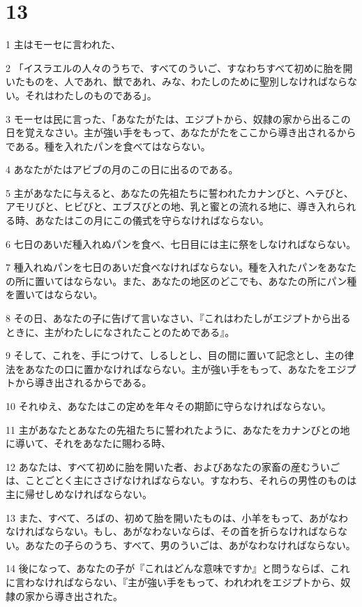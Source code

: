 \chapter{13}

\par 1 主はモーセに言われた、
\par 2 「イスラエルの人々のうちで、すべてのういご、すなわちすべて初めに胎を開いたものを、人であれ、獣であれ、みな、わたしのために聖別しなければならない。それはわたしのものである」。
\par 3 モーセは民に言った、「あなたがたは、エジプトから、奴隷の家から出るこの日を覚えなさい。主が強い手をもって、あなたがたをここから導き出されるからである。種を入れたパンを食べてはならない。
\par 4 あなたがたはアビブの月のこの日に出るのである。
\par 5 主があなたに与えると、あなたの先祖たちに誓われたカナンびと、ヘテびと、アモリびと、ヒビびと、エブスびとの地、乳と蜜との流れる地に、導き入れられる時、あなたはこの月にこの儀式を守らなければならない。
\par 6 七日のあいだ種入れぬパンを食べ、七日目には主に祭をしなければならない。
\par 7 種入れぬパンを七日のあいだ食べなければならない。種を入れたパンをあなたの所に置いてはならない。また、あなたの地区のどこでも、あなたの所にパン種を置いてはならない。
\par 8 その日、あなたの子に告げて言いなさい、『これはわたしがエジプトから出るときに、主がわたしになされたことのためである』。
\par 9 そして、これを、手につけて、しるしとし、目の間に置いて記念とし、主の律法をあなたの口に置かなければならない。主が強い手をもって、あなたをエジプトから導き出されるからである。
\par 10 それゆえ、あなたはこの定めを年々その期節に守らなければならない。
\par 11 主があなたとあなたの先祖たちに誓われたように、あなたをカナンびとの地に導いて、それをあなたに賜わる時、
\par 12 あなたは、すべて初めに胎を開いた者、およびあなたの家畜の産むういごは、ことごとく主にささげなければならない。すなわち、それらの男性のものは主に帰せしめなければならない。
\par 13 また、すべて、ろばの、初めて胎を開いたものは、小羊をもって、あがなわなければならない。もし、あがなわないならば、その首を折らなければならない。あなたの子らのうち、すべて、男のういごは、あがなわなければならない。
\par 14 後になって、あなたの子が『これはどんな意味ですか』と問うならば、これに言わなければならない、『主が強い手をもって、われわれをエジプトから、奴隷の家から導き出された。
